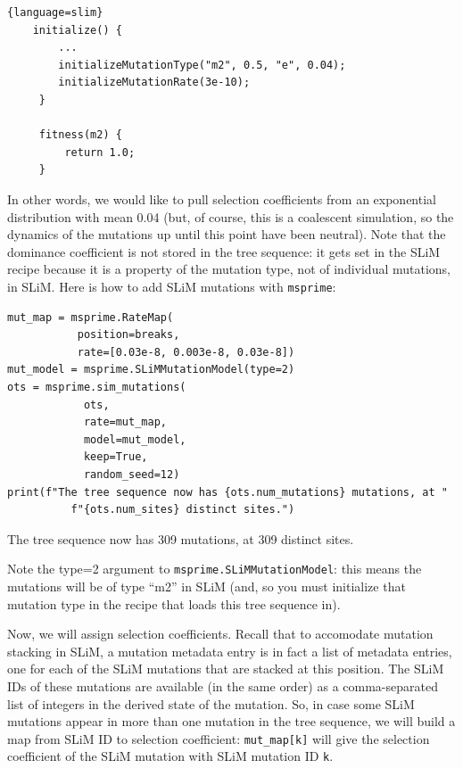 \documentclass[12pt]{article}
\newcommand{\msprime}[0]{\texttt{msprime}\xspace}
\begin{document}
\begin{lstlisting}{language=slim}
    initialize() {
        ...
        initializeMutationType("m2", 0.5, "e", 0.04);
        initializeMutationRate(3e-10);
     }
  
     fitness(m2) {
         return 1.0;
     }
\end{lstlisting}

In other words, we would like to pull selection coefficients from an exponential distribution with mean 0.04
(but, of course, this is a coalescent simulation, so the dynamics of the mutations up until this point have been neutral).
Note that the dominance coefficient is not stored in the tree sequence:
it gets set in the SLiM recipe because it is a property of the mutation type, not of individual mutations, in SLiM.
Here is how to add SLiM mutations with \msprime :

\begin{listing}[H]
    \begin{verbatim}
mut_map = msprime.RateMap(
           position=breaks,
           rate=[0.03e-8, 0.003e-8, 0.03e-8])
mut_model = msprime.SLiMMutationModel(type=2)
ots = msprime.sim_mutations(
            ots,
            rate=mut_map,
            model=mut_model,
            keep=True, 
            random_seed=12)
print(f"The tree sequence now has {ots.num_mutations} mutations, at "
          f"{ots.num_sites} distinct sites.")
  \end{verbatim}
\end{listing}

\begin{pycon}
The tree sequence now has 309 mutations, at 309 distinct sites.
\end{pycon}

Note the type=2 argument to \verb|msprime.SLiMMutationModel|:
this means the mutations will be of type “m2” in SLiM
(and, so you must initialize that mutation type in the recipe that loads this tree sequence in).

Now, we will assign selection coefficients.
Recall that to accomodate mutation stacking in SLiM,
a mutation metadata entry is in fact a list of metadata entries,
one for each of the SLiM mutations that are stacked at this position.
The SLiM IDs of these mutations are available (in the same order) as a comma-separated list of integers in the derived state of the mutation.
So, in case some SLiM mutations appear in more than one mutation in the tree sequence,
we will build a map from SLiM ID to selection coefficient:
\verb|mut_map[k]| will give the selection coefficient of the SLiM mutation with SLiM mutation ID \verb|k|.
\end{document}
